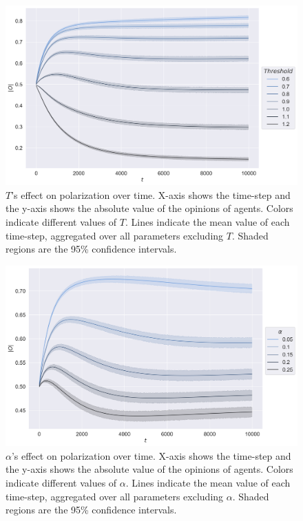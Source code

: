 \documentclass{article}
\begin{document}
\begin{figure}[H]
    \centering
    \includegraphics[width=.8\linewidth]{../plots/overall/Absolute_Opinion_Threshold.png}
  \caption{$T$'s effect on polarization over time. X-axis shows the time-step and the y-axis shows the absolute value of the opinions of agents. Colors indicate different values of $T$. Lines indicate the mean value of each time-step, aggregated over all parameters excluding $T$. Shaded regions are the 95\% confidence intervals.}
  \label{fig:threshold}
\end{figure}

\begin{figure}[H]
    \centering
    \includegraphics[width=.8\linewidth]{../plots/overall/Absolute_Opinion_Positive_Learning_Rate.png}
  \caption{$\alpha$'s effect on polarization over time. X-axis shows the time-step and the y-axis shows the absolute value of the opinions of agents. Colors indicate different values of $\alpha$. Lines indicate the mean value of each time-step, aggregated over all parameters excluding $\alpha$. Shaded regions are the 95\% confidence intervals.}
  \label{fig:alpha}
\end{figure}
\end{document}
